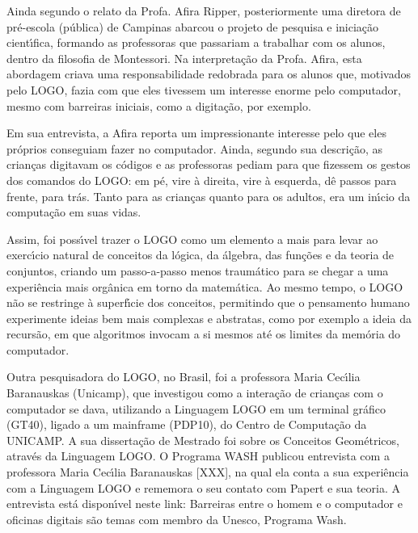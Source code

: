 \documentclass[
12pt,		%
openright,	%
twoside,  %
a4paper,			%
chapter=TITLE,		%
english,			%
french,				%
spanish,			%
brazil				%
]{USPSC-classe/USPSC}
\begin{document}
Ainda segundo o relato da Profa. Afira Ripper, posteriormente uma diretora de pr\'e-escola (p\'ublica) de Campinas abarcou o projeto de pesquisa e inicia\c{c}\~ao cient\'{\i}fica, formando as professoras que passariam a trabalhar com os alunos, dentro da filosofia de Montessori. Na interpreta\c{c}\~ao da Profa. Afira, esta abordagem criava uma responsabilidade redobrada para os alunos que, motivados pelo LOGO, fazia com que eles tivessem um interesse enorme pelo computador, mesmo com barreiras iniciais, como a digita\c{c}\~ao, por exemplo.









Em sua entrevista, a Afira reporta um impressionante interesse pelo que eles pr\'oprios conseguiam fazer no computador. Ainda, segundo sua descri\c{c}\~ao, as crian\c{c}as digitavam os c\'odigos e as professoras pediam para que fizessem os gestos dos comandos do LOGO: \textquotedbl em p\'e\textquotedbl , \textquotedbl vire \`a direita\textquotedbl , \textquotedbl vire \`a esquerda\textquotedbl , \textquotedbl d\^e passos para frente\textquotedbl , \textquotedbl para tr\'as\textquotedbl . Tanto para as crian\c{c}as quanto para os adultos, era um in\'{\i}cio da computa\c{c}\~ao em suas vidas.









Assim, foi poss\'{\i}vel trazer o LOGO como um elemento a mais para levar ao exerc\'{\i}cio natural de conceitos da l\'ogica, da \'algebra, das fun\c{c}\~oes e da teoria de conjuntos, criando um passo-a-passo menos traum\'atico para se chegar a uma experi\^encia mais org\^anica em torno da matem\'atica. Ao mesmo tempo, o LOGO n\~ao se restringe \`a superf\'{\i}cie dos conceitos, permitindo que o pensamento humano experimente ideias bem mais complexas e abstratas, como por exemplo a ideia da recurs\~ao, em que algoritmos invocam a si mesmos at\'e os limites da mem\'oria do computador.









Outra pesquisadora do LOGO, no Brasil, foi a professora Maria Cec\'{\i}lia Baranauskas (Unicamp), que investigou como a intera\c{c}\~ao de crian\c{c}as com o computador se dava, utilizando a Linguagem LOGO em um terminal gr\'afico (GT40), ligado a um mainframe (PDP10), do Centro de Computa\c{c}\~ao da UNICAMP. A sua disserta\c{c}\~ao de Mestrado foi sobre os \textquotedbl Conceitos Geom\'etricos, atrav\'es da Linguagem LOGO\textquotedbl . O Programa WASH publicou entrevista com a professora Maria Cec\'{\i}lia Baranauskas [XXX], na qual ela conta a sua experi\^encia com a Linguagem LOGO e rememora o seu contato com Papert e sua teoria. A entrevista est\'a dispon\'{\i}vel neste link: \textquotedbl Barreiras entre o homem e o computador e oficinas digitais s\~ao temas com membro da Unesco, Programa Wash\textquotedbl .
\end{document}
